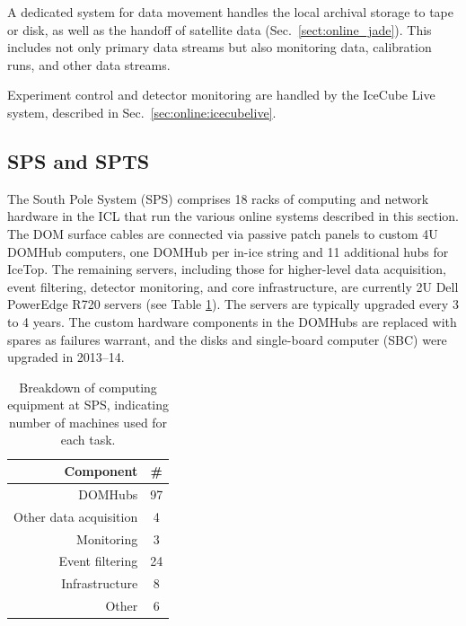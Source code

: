 A dedicated system for data movement handles the local archival storage to
tape or disk, as well as the handoff of satellite data (Sec.~\ref{sect:online_jade}).
This includes not only primary data streams but also monitoring data,
calibration runs, and other data streams.

Experiment control and detector monitoring are handled by the IceCube
Live system, described in Sec.~\ref{sec:online:icecubelive}.



\subsection{\label{sect:sps}SPS and SPTS}

The South Pole System (SPS) comprises 18 racks of computing and
network hardware in the ICL that run the various online systems described in this
section.  The DOM surface cables are connected via passive patch panels to
custom 4U DOMHub computers, one DOMHub per in-ice string and 11 additional
hubs for IceTop.  The remaining servers, including those for higher-level
data acquisition, event filtering, detector monitoring, and core
infrastructure, are currently 2U Dell PowerEdge R720 servers (see Table
\ref{tab:sps_breakdown}).  The servers are typically upgraded every 3 to 4
years.  The custom hardware components in the DOMHubs are replaced with spares as
failures warrant, and the disks and single-board computer (SBC) were
upgraded in 2013--14.

\begin{table}[h]
  \centering
  \begin{tabular}{ r | c }
    \bf{Component} & \bf{\#} \\
    \hline
    DOMHubs & 97 \\
    Other data acquisition & 4 \\
    Monitoring & 3 \\
    Event filtering & 24 \\
    Infrastructure & 8 \\
    Other & 6 \\ 
  \end{tabular}
  \caption{Breakdown of computing equipment at SPS, indicating number of
    machines used for each task.} 
  \label{tab:sps_breakdown}
\end{table}

